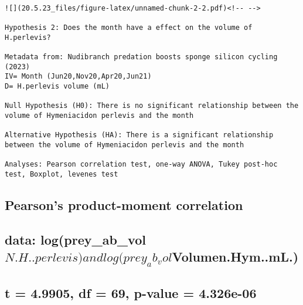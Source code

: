 \documentclass[
]{article}
\begin{document}
\begin{verbatim}

![](20.5.23_files/figure-latex/unnamed-chunk-2-2.pdf)<!-- --> 

Hypothesis 2: Does the month have a effect on the volume of H.perlevis? 

Metadata from: Nudibranch predation boosts sponge silicon cycling (2023)
IV= Month (Jun20,Nov20,Apr20,Jun21)
D= H.perlevis volume (mL)

Null Hypothesis (H0): There is no significant relationship between the volume of Hymeniacidon perlevis and the month

Alternative Hypothesis (HA): There is a significant relationship between the volume of Hymeniacidon perlevis and the month

Analyses: Pearson correlation test, one-way ANOVA, Tukey post-hoc test, Boxplot, levenes test

\end{verbatim}

\hypertarget{section-13}{%
\subsection{}\label{section-13}}

\hypertarget{pearsons-product-moment-correlation}{%
\subsection{Pearson's product-moment
correlation}\label{pearsons-product-moment-correlation}}

\hypertarget{section-14}{%
\subsection{}\label{section-14}}

\hypertarget{data-logprey_ab_voln.h..perlevis-and-logprey_ab_volvolumen.hym..ml.}{%
\subsection{\texorpdfstring{data:
log(prey\_ab\_vol\(N.H..perlevis) and log(prey_ab_vol\)Volumen.Hym..mL.)}{data: log(prey\_ab\_volN.H..perlevis) and log(prey\_ab\_volVolumen.Hym..mL.)}}\label{data-logprey_ab_voln.h..perlevis-and-logprey_ab_volvolumen.hym..ml.}}

\hypertarget{t-4.9905-df-69-p-value-4.326e-06}{%
\subsection{t = 4.9905, df = 69, p-value =
4.326e-06}\label{t-4.9905-df-69-p-value-4.326e-06}}
\end{document}
